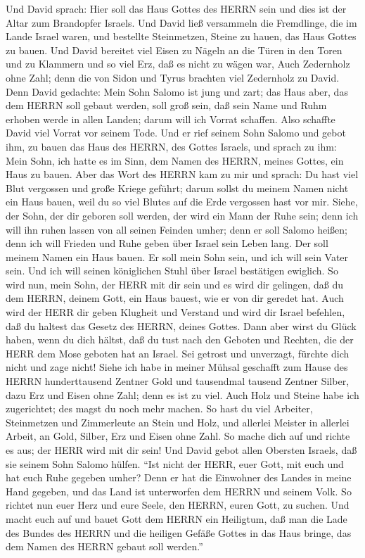  Und David sprach: Hier soll das Haus Gottes des HERRN sein
und dies ist der Altar zum Brandopfer Israels.  Und David
ließ versammeln die Fremdlinge, die im Lande Israel waren, und bestellte
Steinmetzen, Steine zu hauen, das Haus Gottes zu bauen.  Und
David bereitet viel Eisen zu Nägeln an die Türen in den Toren und zu
Klammern und so viel Erz, daß es nicht zu wägen war,  Auch
Zedernholz ohne Zahl; denn die von Sidon und Tyrus brachten viel
Zedernholz zu David.  Denn David gedachte: Mein Sohn Salomo
ist jung und zart; das Haus aber, das dem HERRN soll gebaut werden, soll
groß sein, daß sein Name und Ruhm erhoben werde in allen Landen; darum
will ich Vorrat schaffen. Also schaffte David viel Vorrat vor seinem
Tode.  Und er rief seinem Sohn Salomo und gebot ihm, zu
bauen das Haus des HERRN, des Gottes Israels,  und sprach zu
ihm: Mein Sohn, ich hatte es im Sinn, dem Namen des HERRN, meines
Gottes, ein Haus zu bauen.  Aber das Wort des HERRN kam zu
mir und sprach: Du hast viel Blut vergossen und große Kriege geführt;
darum sollst du meinem Namen nicht ein Haus bauen, weil du so viel
Blutes auf die Erde vergossen hast vor mir.  Siehe, der
Sohn, der dir geboren soll werden, der wird ein Mann der Ruhe sein; denn
ich will ihn ruhen lassen von all seinen Feinden umher; denn er soll
Salomo heißen; denn ich will Frieden und Ruhe geben über Israel sein
Leben lang.  Der soll meinem Namen ein Haus bauen. Er soll
mein Sohn sein, und ich will sein Vater sein. Und ich will seinen
königlichen Stuhl über Israel bestätigen ewiglich.  So wird
nun, mein Sohn, der HERR mit dir sein und es wird dir gelingen, daß du
dem HERRN, deinem Gott, ein Haus bauest, wie er von dir geredet hat.
 Auch wird der HERR dir geben Klugheit und Verstand und
wird dir Israel befehlen, daß du haltest das Gesetz des HERRN, deines
Gottes.  Dann aber wirst du Glück haben, wenn du dich
hältst, daß du tust nach den Geboten und Rechten, die der HERR dem Mose
geboten hat an Israel. Sei getrost und unverzagt, fürchte dich nicht und
zage nicht!  Siehe ich habe in meiner Mühsal geschafft zum
Hause des HERRN hunderttausend Zentner Gold und tausendmal tausend
Zentner Silber, dazu Erz und Eisen ohne Zahl; denn es ist zu viel. Auch
Holz und Steine habe ich zugerichtet; des magst du noch mehr machen.
 So hast du viel Arbeiter, Steinmetzen und Zimmerleute an
Stein und Holz, und allerlei Meister in allerlei Arbeit, 
an Gold, Silber, Erz und Eisen ohne Zahl. So mache dich auf und richte
es aus; der HERR wird mit dir sein!  Und David gebot allen
Obersten Israels, daß sie seinem Sohn Salomo hülfen.  ``Ist
nicht der HERR, euer Gott, mit euch und hat euch Ruhe gegeben umher?
Denn er hat die Einwohner des Landes in meine Hand gegeben, und das Land
ist unterworfen dem HERRN und seinem Volk.  So richtet nun
euer Herz und eure Seele, den HERRN, euren Gott, zu suchen. Und macht
euch auf und bauet Gott dem HERRN ein Heiligtum, daß man die Lade des
Bundes des HERRN und die heiligen Gefäße Gottes in das Haus bringe, das
dem Namen des HERRN gebaut soll werden.''

